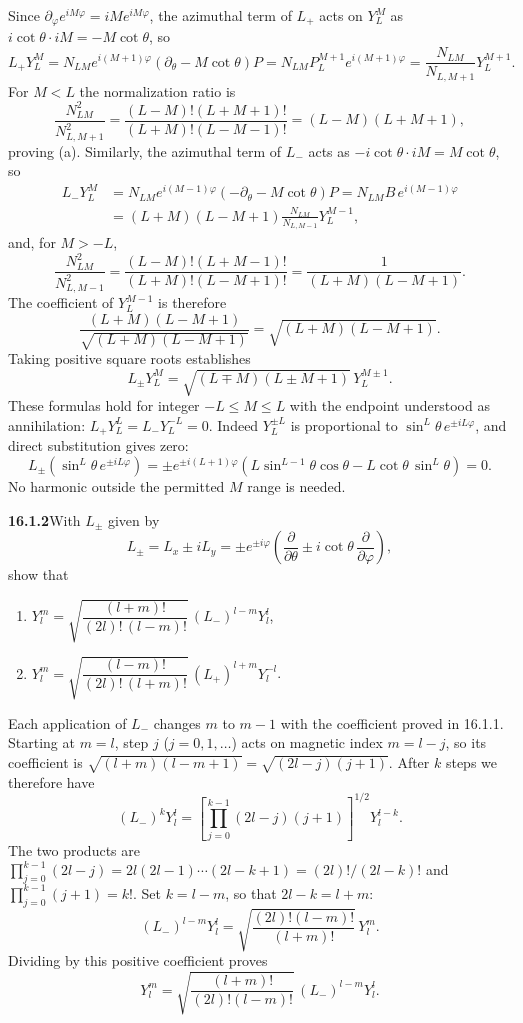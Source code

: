 Since $\partial_\varphi e^{iM\varphi}=iM e^{iM\varphi}$, the
azimuthal term of $L_+$ acts on $Y_L^M$ as
$i\cot\theta\cdot iM=-M\cot\theta$, so
\[
L_+Y_L^M=N_{LM}e^{i(M+1)\varphi}(\partial_\theta-M\cot\theta)P
=N_{LM}P_L^{M+1}e^{i(M+1)\varphi}
=\frac{N_{LM}}{N_{L,M+1}}Y_L^{M+1}.
\]
For $M<L$ the normalization ratio is
\[
\frac{N_{LM}^2}{N_{L,M+1}^2}
=\frac{(L-M)!(L+M+1)!}{(L+M)!(L-M-1)!}
=(L-M)(L+M+1),
\]
proving (a). Similarly, the azimuthal term of $L_-$ acts as
$-i\cot\theta\cdot iM=M\cot\theta$, so
\[
\begin{aligned}
L_-Y_L^M&=N_{LM}e^{i(M-1)\varphi}(-\partial_\theta-M\cot\theta)P
=N_{LM}B\,e^{i(M-1)\varphi}\\
&=(L+M)(L-M+1)
\frac{N_{LM}}{N_{L,M-1}}Y_L^{M-1},
\end{aligned}
\]
and, for $M>-L$,
\[
\frac{N_{LM}^2}{N_{L,M-1}^2}
=\frac{(L-M)!(L+M-1)!}{(L+M)!(L-M+1)!}
=\frac1{(L+M)(L-M+1)}.
\]
The coefficient of $Y_L^{M-1}$ is therefore
\[
\frac{(L+M)(L-M+1)}{\sqrt{(L+M)(L-M+1)}}=\sqrt{(L+M)(L-M+1)}.
\]
Taking positive square roots establishes
\[
\boxed{L_\pm Y_L^M=
\sqrt{(L\mp M)(L\pm M+1)}\,Y_L^{M\pm1}}.
\]
These formulas hold for integer $-L\le M\le L$ with the endpoint
understood as annihilation: $L_+Y_L^L=L_-Y_L^{-L}=0$.
Indeed $Y_L^{\pm L}$ is proportional to
$\sin^L\theta\,e^{\pm iL\varphi}$, and direct substitution gives zero:
\[
L_\pm(\sin^L\theta\,e^{\pm iL\varphi})
=\pm e^{\pm i(L+1)\varphi}
(L\sin^{L-1}\theta\cos\theta-L\cot\theta\,\sin^L\theta)=0.
\]
No harmonic outside the permitted $M$ range is needed.

\par\bigskip
\noindent\textbf{16.1.2}\quad With $L_{\pm}$ given by
\[
L_{\pm}=L_{x}\pm iL_{y}=\pm e^{\pm i\varphi}
\left(\frac{\partial}{\partial\theta}
\pm i\cot\theta\,\frac{\partial}{\partial\varphi}\right),
\]
show that
\begin{enumerate}
\item[(a)] $Y_{l}^{m}=\sqrt{\dfrac{(l+m)!}{(2l)!\,(l-m)!}}\,
(L_{-})^{l-m}Y_{l}^{l}$,
\item[(b)] $Y_{l}^{m}=\sqrt{\dfrac{(l-m)!}{(2l)!\,(l+m)!}}\,
(L_{+})^{l+m}Y_{l}^{-l}$.
\end{enumerate}
\solution
Each application of $L_-$ changes $m$ to $m-1$ with the coefficient
proved in 16.1.1. Starting at $m=l$, step $j$ ($j=0,1,\ldots$) acts on
magnetic index $m=l-j$, so its coefficient is
$\sqrt{(l+m)(l-m+1)}=\sqrt{(2l-j)(j+1)}$. After $k$ steps we therefore
have
\[
(L_-)^kY_l^l
=\left[\prod_{j=0}^{k-1}(2l-j)(j+1)\right]^{1/2}Y_l^{l-k}.
\]
The two products are
$\prod_{j=0}^{k-1}(2l-j)=2l(2l-1)\cdots(2l-k+1)=(2l)!/(2l-k)!$ and
$\prod_{j=0}^{k-1}(j+1)=k!$. Set $k=l-m$, so that $2l-k=l+m$:
\[
(L_-)^{l-m}Y_l^l
=\sqrt{\frac{(2l)!(l-m)!}{(l+m)!}}\,Y_l^m.
\]
Dividing by this positive coefficient proves
\[
\boxed{Y_l^m=\sqrt{\frac{(l+m)!}{(2l)!(l-m)!}}\,
(L_-)^{l-m}Y_l^l}.
\]

